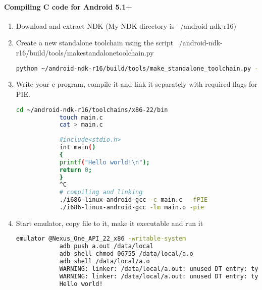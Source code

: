 \documentclass[../main.tex]{subfile}
\begin{document}
		\paragraph{Compiling C code for Android 5.1+}
		\begin{enumerate}
			\item Download and extract NDK (My NDK directory is ~/android-ndk-r16)
			\item Create a new standalone toolchain using the script ~/android-ndk-r16/build/tools/make\textunderscore standalone\textunderscore toolchain.py
			\begin{lstlisting}[language=bash, numbers=none]
			python ~/android-ndk-r16/build/tools/make_standalone_toolchain.py --arch x86 --api 22 --install-dir ~/android-ndk-r16/toolchains/x86-22
			\end{lstlisting}
			\item Write your c program, compile it and link it separately with required flags for PIE.
			\begin{lstlisting}[language=bash]
			cd ~/android-ndk-r16/toolchains/x86-22/bin
			touch main.c
			cat > main.c
			
			#include<stdio.h>
			int main()
			{
			printf("Hello world!\n");
			return 0;
			}
			^C
			# compiling and linking
			./i686-linux-android-gcc -c main.c  -fPIE
			./i686-linux-android-gcc -lm main.o -pie
			\end{lstlisting}
			\item Start emulator, copy file to it, make it executable and run it
			\begin{lstlisting}[language=bash, firstnumber=15]
			emulator @Nexus_One_API_22_x86 -writable-system
			adb push a.out /data/local
			adb shell chmod 06755 /data/local/a.o
			adb shell /data/local/a.o
			WARNING: linker: /data/local/a.out: unused DT entry: type 0x6ffffffe arg 0x32c
			WARNING: linker: /data/local/a.out: unused DT entry: type 0x6fffffff arg 0x1
			Hello world!
			\end{lstlisting}
		\end{enumerate}
	
\end{document}
